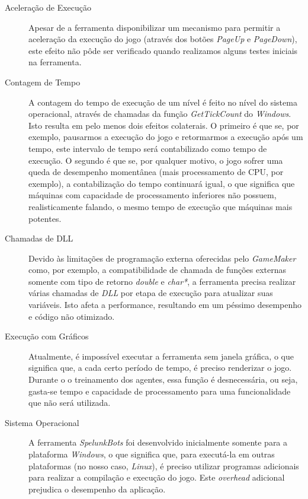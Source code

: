 \begin{description}
	\item[Aceleração de Execução]
		Apesar de a ferramenta disponibilizar um mecanismo para permitir a
		aceleração da execução do jogo (através dos botões \textit{PageUp} e
		\textit{PageDown}), este efeito não pôde ser verificado quando
		realizamos alguns testes iniciais na ferramenta.

	\item[Contagem de Tempo]
		A contagem do tempo de execução de um nível é feito no nível do sistema
		operacional, através de chamadas da função \textit{GetTickCount} do
		\textit{Windows}. Isto resulta em pelo menos dois efeitos colaterais. O
		primeiro é que se, por exemplo, pausarmos a execução do jogo e
		retormarmos a execução após um tempo, este intervalo de tempo será
		contabilizado como tempo de execução. O segundo é que se, por qualquer
		motivo, o jogo sofrer uma queda de desempenho momentânea (mais
		processamento de CPU, por exemplo), a contabilização do tempo continuará
		igual, o que significa que máquinas com capacidade de processamento
		inferiores não possuem, realisticamente falando, o mesmo tempo de
		execução que máquinas mais potentes.

	\item[Chamadas de DLL]
		Devido às limitações de programação externa oferecidas pelo
		\textit{GameMaker} como, por exemplo, a compatibilidade de chamada de
		funções	externas somente com tipo de retorno \textit{double} e
		\textit{char*}, a ferramenta precisa realizar várias chamadas de
		\textit{DLL} por etapa de execução para atualizar suas variáveis. Isto
		afeta a performance, resultando em um péssimo desempenho e código não
		otimizado.

	\item[Execução com Gráficos]
		Atualmente, é impossível executar a ferramenta sem janela gráfica, o que
		significa que, a cada certo período de tempo, é preciso renderizar o
		jogo. Durante o o treinamento dos agentes, essa função é desnecessária,
		ou seja, gasta-se tempo e capacidade de processamento para uma
		funcionalidade que não será utilizada.

	\item[Sistema Operacional]
		A ferramenta \textit{SpelunkBots} foi desenvolvido inicialmente somente
		para a plataforma \textit{Windows}, o que significa que, para executá-la
		em outras plataformas (no nosso caso, \textit{Linux}), é preciso
		utilizar programas adicionais para realizar a compilação e execução do
		jogo. Este \textit{overhead} adicional prejudica o desempenho da
		aplicação.
\end{description}


